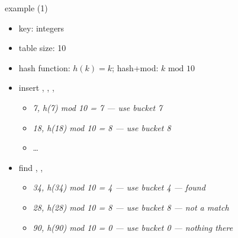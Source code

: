 \begin{frame}{example (1)}
    \begin{itemize}
    \item key: integers
    \item table size: 10
    \item hash function: $h(k) = k$; hash+mod: $k \text{~mod~} 10$
    \item insert , , , 
        \begin{itemize}
            \item<2-> \textit<2>{7, h(7) mod 10 = 7 --- use bucket 7}
            \item<3-> \textit<3>{18, h(18) mod 10 = 8 --- use bucket 8}
            \item<3-> \ldots
        \end{itemize}
    \item<6-> find , , 
        \begin{itemize}
            \item<6-> \textit<6>{34, h(34) mod 10 = 4 --- use bucket 4 --- found}
            \item<7-> \textit<7>{28, h(28) mod 10 = 8 --- use bucket 8 --- not a match}
            \item<8-> \textit<8>{90, h(90) mod 10 = 0 --- use bucket 0 --- nothing there}
        \end{itemize}
    \end{itemize}
\end{frame}
